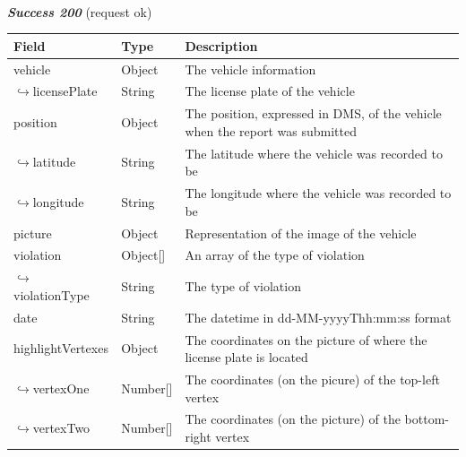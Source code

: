 						\paragraph{}
							\textcolor{myGreen}{\textit{\textbf{Success 200}}} (request ok)
							\vspace{-2mm}
							\begin{table}[!h]
								\begin{tabular}{L{0.3\textwidth}L{0.15\textwidth}L{0.43\textwidth}}
									\toprule
									\textbf{Field} & \textbf{Type} & \textbf{Description} \\
									\midrule
								 	vehicle & Object & The vehicle information \\
								 	\hspace{2.5mm}$\hookrightarrow$licensePlate & String & The license plate of the vehicle \\
								 	position & Object & The position, expressed in DMS, of the vehicle when the report was submitted  \\
								 	\hspace{2.5mm}$\hookrightarrow$latitude & String & The latitude where the vehicle was recorded to be \\
								 	\hspace{2.5mm}$\hookrightarrow$longitude & String & The longitude where the vehicle was recorded to be \\
								 	picture & Object & Representation of the image of the vehicle \\
								 	violation & Object[] & An array of the type of violation \\
								 	\hspace{2.5mm}$\hookrightarrow$violationType & String & The type of violation \\
								 	date & String & The datetime in \newline dd-MM-yyyyThh:mm:ss format \\
								 	highlightVertexes & Object & The coordinates on the picture of where the license plate is located \\
								 	\hspace{2.5mm}$\hookrightarrow$vertexOne & Number[] & The coordinates (on the picure) of the top-left vertex \\
								 	\hspace{2.5mm}$\hookrightarrow$vertexTwo & Number[] & The coordinates (on the picture) of the bottom-right vertex \\
								 	\bottomrule
								\end{tabular}
							\end{table}
